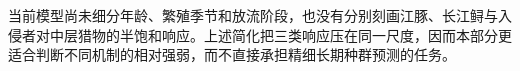当前模型尚未细分年龄、繁殖季节和放流阶段，也没有分别刻画江豚、长江鲟与入侵者对中层猎物的半饱和响应。上述简化把三类响应压在同一尺度，因而本部分更适合判断不同机制的相对强弱，而不直接承担精细长期种群预测的任务。

